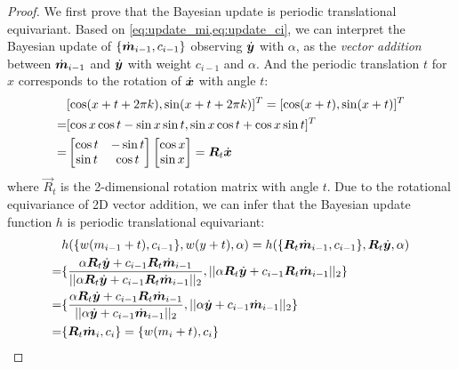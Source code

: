 \begin{proof}
We first prove that the Bayesian update is periodic translational equivariant. Based on \cref{eq:update_mi,eq:update_ci}, we can interpret the Bayesian update of $\{\dot{\bm{m}}_{i-1},c_{i-1}\}$ observing $\dot{\bm{y}}$ with $\alpha$, as the \textit{vector addition} between $\dot{\bm{m}}_{i-1}$ and $\dot{\bm{y}}$ with weight $c_{i-1}$ and $\alpha$. And the periodic translation $t$ for $x$ corresponds to the rotation of $\dot{\bm{x}}$ with angle $t$:
 \begin{align*}
     &[\cos(x+t+2\pi k),\sin(x+t+2\pi k)]^T=[\cos(x+t),\sin(x+t)]^T\\
     =&[\cos x\cos t-\sin x\sin t,\sin x\cos t +\cos x\sin t]^T\\
     =&\begin{bmatrix}
\cos t & -\sin t \\
\sin t & \cos t
\end{bmatrix}\begin{bmatrix}
\cos x \\
\sin x 
\end{bmatrix}=\boldsymbol{R}_t\dot{{\bm{x}}}
 \end{align*}
 where $\vec{R}_t$ is the 2-dimensional rotation matrix with angle $t$. Due to the rotational equivariance of 2D vector addition, we can infer that the Bayesian update function $h$ is periodic translational equivariant:
\begin{align}\label{eq:equiv_bu}
&h(\{w(m_{i-1}+t),c_{i-1}\},w(y+t),\alpha)=h(\{{\bm{R}}_t\dot{\bm{m}}_{i-1},c_{i-1}\},{\bm{R}}_t\dot{\bm{y}},\alpha)\nonumber\\
=&\{\frac{\alpha {\bm{R}}_t\dot{\bm{y}}+c_{i-1}{\bm{R}}_t\dot{\bm{m}}_{i-1}}{||\alpha{\bm{R}}_t\dot{\bm{y}}+c_{i-1}{\bm{R}}_t\dot{\bm{m}}_{i-1}||_2},||\alpha{\bm{R}}_t\dot{\bm{y}}+c_{i-1}{\bm{R}}_t\dot{\bm{m}}_{i-1}||_2\}\nonumber\\
=&\{\frac{\alpha {\bm{R}}_t\dot{\bm{y}}+c_{i-1}{\bm{R}}_t\dot{\bm{m}}_{i-1}}{||\alpha\dot{\bm{y}}+c_{i-1}\dot{\bm{m}}_{i-1}||_2},||\alpha\dot{\bm{y}}+c_{i-1}\dot{\bm{m}}_{i-1}||_2\}\nonumber\\
 =&\{{\bm{R}}_t\dot{\bm{m}}_i,c_i \}=\{w(m_{i}+t),c_{i}\}
\end{align}


\end{proof}
